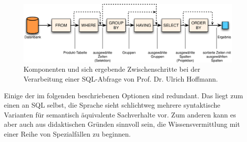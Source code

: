 \begin{figure}
  \centering \includegraphics{images/sql-steps.png}
  \caption{Komponenten und sich ergebende Zwischenschritte bei der Verarbeitung einer SQL-Abfrage von Prof. Dr. Ulrich Hoffmann.}
  \label{fig:sql-steps}
\end{figure}

Einige der im folgenden beschriebenen Optionen sind redundant. Das liegt zum einen an SQL selbst, die Sprache sieht schlichtweg mehrere syntaktische Varianten für semantisch äquivalente Sachverhalte vor. Zum anderen kann es aber auch aus didaktischen Gründen sinnvoll sein, die Wissensvermittlung mit einer Reihe von Spezialfällen zu beginnen.

